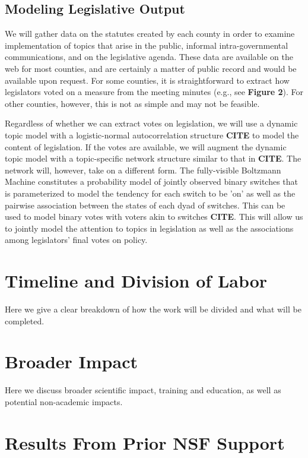 \subsection{Modeling Legislative Output}

We will gather data on the statutes created by each county in order to examine implementation of topics that arise in the public, informal intra-governmental communications, and on the legislative agenda. These data are available on the web for most counties, and are certainly a matter of public record and would be available upon request. For some counties, it is straightforward to extract how legislators voted on a measure from the meeting minutes (e.g., see {\bf Figure 2}). For other counties, however, this is not as simple and may not be feasible. 

Regardless of whether we can extract votes on legislation, we will use a dynamic topic model with a logistic-normal autocorrelation structure {\bf CITE} to model the content of legislation. If the votes are available, we will augment the dynamic topic model with a topic-specific network structure similar to that in {\bf CITE}. The network will, however, take on a different form. The fully-visible Boltzmann Machine constitutes a probability model of jointly observed binary switches that is parameterized to model the tendency for each switch to be 'on' as well as the pairwise association between the states of each dyad of switches. This can be used to model binary votes with voters akin to switches {\bf CITE}. This will allow us to jointly model the attention to topics in legislation as well as the associations among legislators' final votes on policy.

\section{Timeline and Division of Labor}

Here we give a clear breakdown of how the work will be divided and what will be completed.

\section{Broader Impact}

Here we discuss broader scientific impact, training and education, as well as potential non-academic impacts.

\section{Results From Prior NSF Support}

